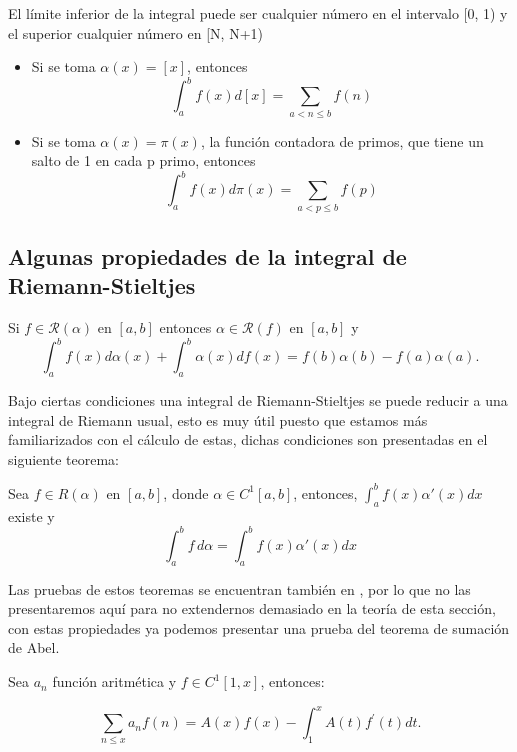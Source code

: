 \begin{note}
El límite inferior de la integral puede ser cualquier número en el intervalo [0, 1) y el superior cualquier número en [N, N+1)
\end{note}

\begin{eg}
\phantom{uwu}
\begin{itemize}
\item Si se toma $\alpha(x)=[x]$, entonces
$$
\int_a^b f(x) d[x]=\sum_{a<n \leq b} f(n)
$$

\item Si se toma $\alpha(x)=\pi(x)$, la función contadora de primos, que tiene un salto de 1 en cada p primo, entonces
$$
\int_a^b f(x) d \pi(x)=\sum_{a<p \leq b} f(p)
$$
\end{itemize}
\end{eg}

\subsection{Algunas propiedades de la integral de Riemann-Stieltjes}


\begin{theorem}\label{integrac partes}
    Si $f\in \mathcal{R}(\alpha)$ en $[a,b]$ entonces $\alpha \in\mathcal{R}(f)$ en $[a,b]$ y $$\int_{a}^{b}f(x)d\alpha(x)+\int_{a}^{b}\alpha(x)df(x)=f(b)\alpha(b)-f(a)\alpha(a).$$
\end{theorem}

Bajo ciertas condiciones una integral de Riemann-Stieltjes se puede reducir a una integral de Riemann usual, esto es muy útil puesto que estamos más familiarizados con el cálculo de estas, dichas condiciones son presentadas en el siguiente teorema:

\begin{theorem}\label{reduccion a riemann}
    Sea $ f \in R(\alpha) $ en $[a, b]$, donde $ \alpha \in C^1[a, b]$, entonces,
$ \displaystyle\int_{a}^{b} f(x)\alpha'(x)dx$
existe y\[ \int_{a}^{b} f \,d\alpha = \int_{a}^{b} f(x)\alpha'(x)dx \]
\end{theorem}

Las pruebas de estos teoremas se encuentran también en \cite{Apostol:105425}, por lo que no las presentaremos aquí para no extendernos demasiado en la teoría de esta sección, con estas propiedades ya podemos presentar una prueba  del teorema de  sumación de Abel.

\begin{theorem}\label{Teorema sumacion de Abel}
Sea $a_n$ función aritmética y $f\in C^1[1,x]$, entonces:

$$
\sum_{n \leq x} a_n f(n)=A(x) f(x)-\int_1^x A(t) f^{\prime}(t) d t .
$$
\end{theorem}

